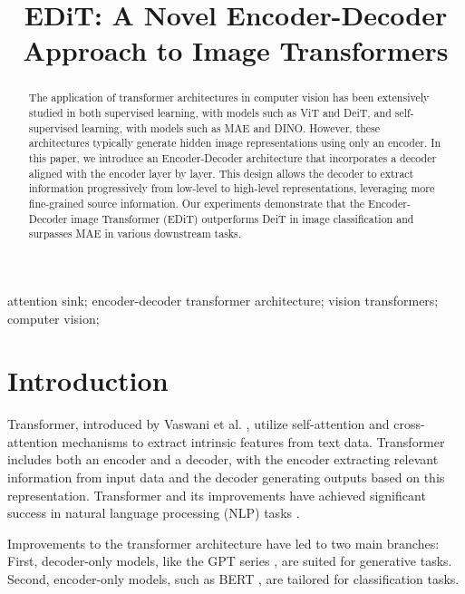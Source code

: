 \documentclass[anon,12pt]{colt2024} %
\title[Short Title]{
  EDiT: A Novel Encoder-Decoder Approach to Image Transformers
  }
\begin{document}
\maketitle

\begin{abstract}%
The application of transformer architectures in computer vision has been extensively studied in both supervised learning, with models such as ViT and DeiT, and self-supervised learning, with models such as MAE and DINO. 
However, these architectures typically generate hidden image representations using only an encoder. 
In this paper, we introduce an Encoder-Decoder architecture that incorporates a decoder aligned with the encoder layer by layer. This design allows the decoder to extract information progressively from low-level to high-level representations, leveraging more fine-grained source information. 
Our experiments demonstrate that the Encoder-Decoder image Transformer (EDiT) outperforms DeiT in image classification and surpasses MAE in various downstream tasks.

\end{abstract}

\begin{keywords}%
  attention sink; encoder-decoder transformer architecture; vision transformers; computer vision; %
\end{keywords}

\section{Introduction}

Transformer, introduced by Vaswani et al. \cite{vaswani2017attention}, utilize self-attention and cross-attention mechanisms to extract intrinsic features from text data. 
Transformer includes both an encoder and a decoder, with the encoder extracting relevant information from input data and the decoder generating outputs based on this representation.
Transformer and its improvements have achieved significant success in natural language processing (NLP) tasks \cite{vaswani2017attention, devlin2018bert,radford2018improving, brown2020language,ouyang2022training}.

Improvements to the transformer architecture have led to two main branches: First, decoder-only models, like the GPT series \cite{radford2018improving, brown2020language,ouyang2022training}, are suited for generative tasks. Second, encoder-only models, such as BERT  \cite{devlin2018bert}, are tailored for classification tasks.
\end{document}
